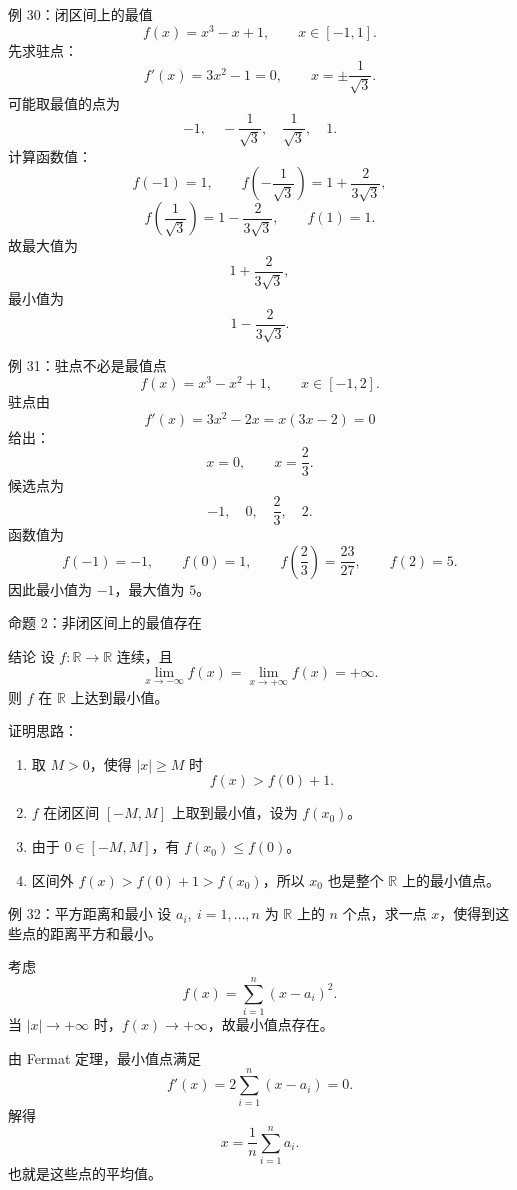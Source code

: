 \documentclass[aspectratio=169,10pt]{ctexbeamer}
\newcommand{\R}{\mathbb{R}}
\begin{document}
\begin{frame}[t]{例 30：闭区间上的最值}
\footnotesize
\[
  f(x)=x^3-x+1,\qquad x\in[-1,1].
\]
先求驻点：
\[
  f'(x)=3x^2-1=0,\qquad x=\pm\frac1{\sqrt3}.
\]
可能取最值的点为
\[
  -1,\quad -\frac1{\sqrt3},\quad \frac1{\sqrt3},\quad 1.
\]
计算函数值：
\[
  f(-1)=1,\qquad
  f\left(-\frac1{\sqrt3}\right)=1+\frac2{3\sqrt3},
\]
\[
  f\left(\frac1{\sqrt3}\right)=1-\frac2{3\sqrt3},\qquad
  f(1)=1.
\]
故最大值为
\[
  1+\frac2{3\sqrt3},
\]
最小值为
\[
  1-\frac2{3\sqrt3}.
\]
\end{frame}

\begin{frame}[t]{例 31：驻点不必是最值点}
\small
\[
  f(x)=x^3-x^2+1,\qquad x\in[-1,2].
\]
驻点由
\[
  f'(x)=3x^2-2x=x(3x-2)=0
\]
给出：
\[
  x=0,\qquad x=\frac23.
\]
候选点为
\[
  -1,\quad 0,\quad \frac23,\quad 2.
\]
函数值为
\[
  f(-1)=-1,\qquad f(0)=1,\qquad
  f\left(\frac23\right)=\frac{23}{27},\qquad f(2)=5.
\]
因此最小值为 $-1$，最大值为 $5$。
\end{frame}

\begin{frame}[t]{命题 2：非闭区间上的最值存在}
\small
\begin{block}{结论}
设 $f:\R\to\R$ 连续，且
\[
  \lim_{x\to-\infty}f(x)=\lim_{x\to+\infty}f(x)=+\infty.
\]
则 $f$ 在 $\R$ 上达到最小值。
\end{block}

证明思路：
\begin{enumerate}
  \item 取 $M>0$，使得 $|x|\ge M$ 时
  \[
    f(x)>f(0)+1.
  \]
  \item $f$ 在闭区间 $[-M,M]$ 上取到最小值，设为 $f(x_0)$。
  \item 由于 $0\in[-M,M]$，有 $f(x_0)\le f(0)$。
  \item 区间外 $f(x)>f(0)+1>f(x_0)$，所以 $x_0$ 也是整个 $\R$ 上的最小值点。
\end{enumerate}
\end{frame}

\begin{frame}[t]{例 32：平方距离和最小}
\small
设 $a_i,\ i=1,\ldots,n$ 为 $\R$ 上的 $n$ 个点，求一点 $x$，使得到这些点的距离平方和最小。

考虑
\[
  f(x)=\sum_{i=1}^n(x-a_i)^2.
\]
当 $|x|\to+\infty$ 时，$f(x)\to+\infty$，故最小值点存在。

由 Fermat 定理，最小值点满足
\[
  f'(x)=2\sum_{i=1}^n(x-a_i)=0.
\]
解得
\[
  \boxed{x=\frac1n\sum_{i=1}^n a_i.}
\]
也就是这些点的平均值。
\end{frame}
\end{document}

